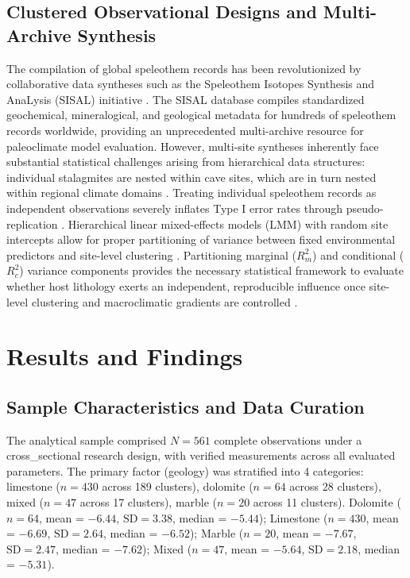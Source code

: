 \documentclass[sn-basic,Numbered]{sn-jnl}%
\begin{document}
\subsection{Clustered Observational Designs and Multi-Archive Synthesis}
The compilation of global speleothem records has been revolutionized by collaborative data syntheses such as the Speleothem Isotopes Synthesis and AnaLysis (SISAL) initiative \cite{atsawawaranunt2018, comasbru2020}. The SISAL database compiles standardized geochemical, mineralogical, and geological metadata for hundreds of speleothem records worldwide, providing an unprecedented multi-archive resource for paleoclimate model evaluation. However, multi-site syntheses inherently face substantial statistical challenges arising from hierarchical data structures: individual stalagmites are nested within cave sites, which are in turn nested within regional climate domains \cite{railsback2015}. Treating individual speleothem records as independent observations severely inflates Type I error rates through pseudo-replication \cite{fohlmeister2020}. Hierarchical linear mixed-effects models (LMM) with random site intercepts allow for proper partitioning of variance between fixed environmental predictors and site-level clustering \cite{nakagawa2013}. Partitioning marginal ($R^2_m$) and conditional ($R^2_c$) variance components provides the necessary statistical framework to evaluate whether host lithology exerts an independent, reproducible influence once site-level clustering and macroclimatic gradients are controlled \cite{nakagawa2013}.

\section{Results and Findings}
\label{sec:results}
\subsection{Sample Characteristics and Data Curation}
The analytical sample comprised $N = 561$ complete observations under a cross\_sectional research design, with verified measurements across all evaluated parameters. The primary factor (geology) was stratified into 4 categories: limestone ($n = 430$ across 189 clusters), dolomite ($n = 64$ across 28 clusters), mixed ($n = 47$ across 17 clusters), marble ($n = 20$ across 11 clusters). Dolomite ($n = 64$, mean = $-6.44$, $\text{SD} = 3.38$, median = $-5.44$); Limestone ($n = 430$, mean = $-6.69$, $\text{SD} = 2.64$, median = $-6.52$); Marble ($n = 20$, mean = $-7.67$, $\text{SD} = 2.47$, median = $-7.62$); Mixed ($n = 47$, mean = $-5.64$, $\text{SD} = 2.18$, median = $-5.31$).
\end{document}
